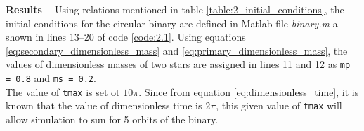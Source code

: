 \documentclass[a4paper]{article}
\begin{document}
\begin{enumerate} [label*=\textbf{(\alph*)}]
				\subitem \textbf{Results  --}
				Using relations mentioned in table \ref{table:2_initial_conditions}, the initial conditions for the circular binary are defined in Matlab file \textit{binary.m} a shown in lines 13--20 of code \ref{code:2.1}. Using equations \ref{eq:secondary_dimensionless_mass} and \ref{eq:primary_dimensionless_mass}, the values of dimensionless masses of two stars are assigned in lines 11 and 12 as \texttt{mp = 0.8} and \texttt{ms = 0.2}.\\				
				The value of \texttt{tmax} is set ot \(10\pi\). Since from equation \ref{eq:dimensionless_time}, it is known that the value of dimensionless time is \(2\pi\), this given value of \texttt{tmax} will allow simulation to sun for 5 orbits of the binary. 
				
				\begin{figure} [h] 
					
				\end{figure}
				
			

\end{enumerate}
\end{document}
